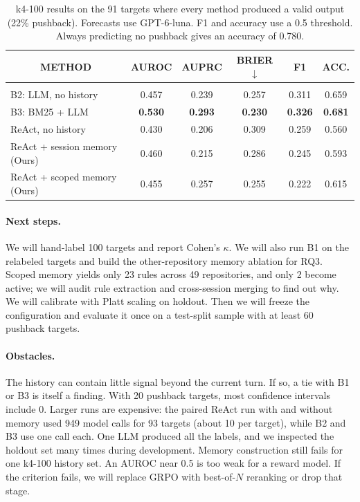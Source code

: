 \documentclass{article} %
\begin{document}
\begin{table}[t]
\caption{k4-100 results on the 91 targets where every method produced a valid output (22\% pushback). Forecasts use GPT-6-luna. F1 and accuracy use a 0.5 threshold. Always predicting no pushback gives an accuracy of 0.780.}
\label{tab:k4-100}
\begin{center}
\begin{tabular}{lccccc}
\multicolumn{1}{c}{\bf METHOD} &\multicolumn{1}{c}{\bf AUROC} &\multicolumn{1}{c}{\bf AUPRC} &\multicolumn{1}{c}{\bf BRIER $\downarrow$} &\multicolumn{1}{c}{\bf F1} &\multicolumn{1}{c}{\bf ACC.}
\\ \hline \\
B2: LLM, no history     &0.457 &0.239 &0.257 &0.311 &0.659 \\
B3: BM25 + LLM          &\bf 0.530 &\bf 0.293 &\bf 0.230 &\bf 0.326 &\bf 0.681 \\
ReAct, no history       &0.430 &0.206 &0.309 &0.259 &0.560 \\
ReAct + session memory (Ours)  &0.460 &0.215 &0.286 &0.245 &0.593 \\
ReAct + scoped memory (Ours)   &0.455 &0.257 &0.255 &0.222 &0.615 \\
\end{tabular}
\end{center}
\end{table}


\paragraph{Next steps.}
We will hand-label 100 targets and report Cohen's $\kappa$.
We will also run B1 on the relabeled targets and build the other-repository memory ablation for RQ3.
Scoped memory yields only 23 rules across 49 repositories, and only 2 become active; we will audit rule extraction and cross-session merging to find out why.
We will calibrate with Platt scaling on holdout.
Then we will freeze the configuration and evaluate it once on a test-split sample with at least 60 pushback targets.

\paragraph{Obstacles.}
The history can contain little signal beyond the current turn.
If so, a tie with B1 or B3 is itself a finding.
With 20 pushback targets, most confidence intervals include 0.
Larger runs are expensive: the paired ReAct run with and without memory used 949 model calls for 93 targets (about 10 per target), while B2 and B3 use one call each.
One LLM produced all the labels, and we inspected the holdout set many times during development.
Memory construction still fails for one k4-100 history set.
An AUROC near 0.5 is too weak for a reward model.
If the criterion fails, we will replace GRPO with best-of-$N$ reranking or drop that stage.
\end{document}
